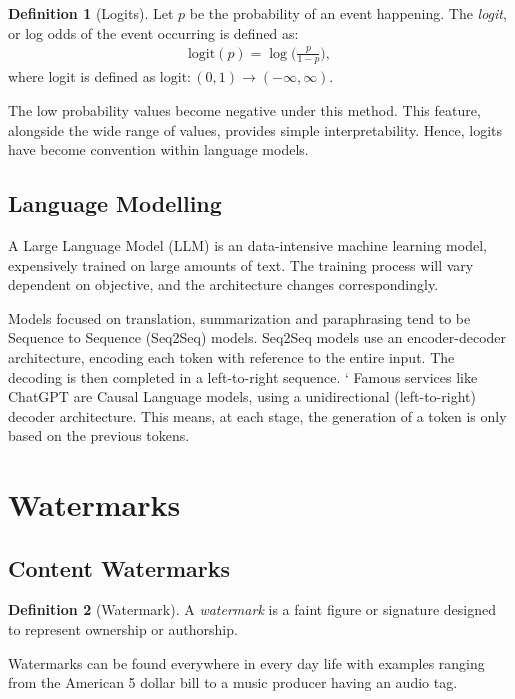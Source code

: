 \documentclass{l4proj}
\theoremstyle{definition}
\newtheorem{definition}{Definition}[section]
\begin{document}
        \begin{definition}[Logits]
            Let $p$ be the probability of an event happening. The \emph{logit}, or log odds of the event occurring is defined as: 
            \begin{align}
                \text{logit}(p) = \log\bigg(\frac{p}{1-p}\bigg),
            \end{align}
            where logit is defined as $\text{logit}: (0,1) \rightarrow (-\infty, \infty)$.
        \end{definition}
        
        The low probability values become negative under this method. This feature, alongside the wide range of values, provides simple interpretability. Hence, logits have become convention within language models.

    \subsection{Language Modelling}
        A Large Language Model (LLM) is an data-intensive machine learning model, expensively trained on large amounts of text. The training process will vary dependent on objective, and the architecture changes correspondingly.

        Models focused on translation, summarization and paraphrasing tend to be Sequence to Sequence (Seq2Seq) models. Seq2Seq models use an encoder-decoder architecture, encoding each token with reference to the entire input. The decoding is then completed in a left-to-right sequence.
`
        Famous services like ChatGPT are Causal Language models, using a unidirectional (left-to-right) decoder architecture. This means, at each stage, the generation of a token is only based on the previous tokens. 

\section{Watermarks}
    \subsection{Content Watermarks}
        \begin{definition}[Watermark]
            A \emph{watermark} is a faint figure or signature designed to represent ownership or authorship.
        \end{definition}
        Watermarks can be found everywhere in every day life with examples ranging from the American 5 dollar bill to a music producer having an audio tag. 
        
\end{document}

